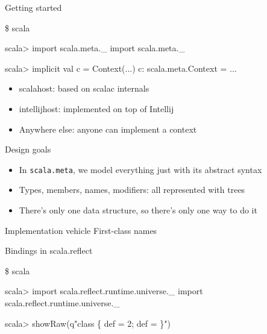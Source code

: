 \documentclass[svgnames,dvipsnames,hyperref={bookmarks=false},usepdftitle=false]{beamer}
\begin{document}

\begin{frame}[fragile]{Getting started}
\begin{semiverbatim}
\$ scala

scala> import scala.meta.\_
import scala.meta.\_

scala> implicit val c = Context(...)
c: scala.meta.Context = ...
\end{semiverbatim}

\vskip25pt
\begin{itemize}
\item<2-> scalahost: based on scalac internals
\item<3-> intellijhost: implemented on top of Intellij
\item<4-> Anywhere else: anyone can implement a context
\end{itemize}
\end{frame}

\begin{frame}{Design goals}
\begin{itemize}
\item In \texttt{scala.meta}, we model everything just with its abstract syntax
\item Types, members, names, modifiers: all represented with trees
\item There's only one data structure, so there's only one way to do it
\end{itemize}
\end{frame}

\begin{frame}{Implementation vehicle}
First-class names
\end{frame}

\begin{frame}[fragile]{Bindings in scala.reflect}
\begin{semiverbatim}
\small
\$ scala

scala> import scala.reflect.runtime.universe.\_
import scala.reflect.runtime.universe.\_

scala> showRaw(q"class  \{ def  = 2; def  =  \}")
\end{semiverbatim}
\end{frame}
\end{document}
